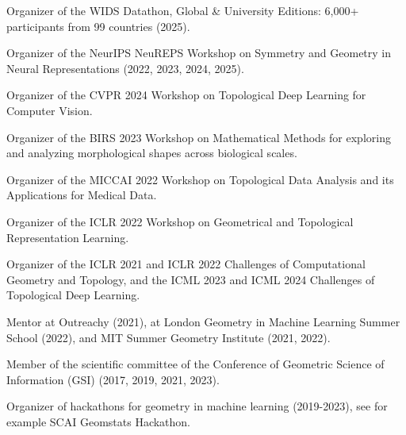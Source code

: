 Organizer of the WIDS Datathon, Global & University Editions: 6,000+ participants from 99 countries (2025).

Organizer of the NeurIPS NeuREPS Workshop on Symmetry and Geometry in Neural Representations (2022, 2023, 2024, 2025).

Organizer of the CVPR 2024 Workshop on Topological Deep Learning for Computer Vision.

Organizer of the BIRS 2023 Workshop on Mathematical Methods for exploring and analyzing morphological shapes across biological scales.

Organizer of the MICCAI 2022 Workshop on Topological Data Analysis and its Applications for Medical Data.

Organizer of the ICLR 2022 Workshop on Geometrical and Topological Representation Learning.

Organizer of the ICLR 2021 and ICLR 2022 Challenges of Computational Geometry and Topology, and the ICML 2023 and ICML 2024 Challenges of Topological Deep Learning.

Mentor at Outreachy (2021), at London Geometry in Machine Learning Summer School (2022), and MIT Summer Geometry Institute (2021, 2022).

Member of the scientific committee of the Conference of Geometric Science of Information (GSI) (2017, 2019, 2021, 2023).

Organizer of hackathons for geometry in machine learning (2019-2023), see for example SCAI Geomstats Hackathon.